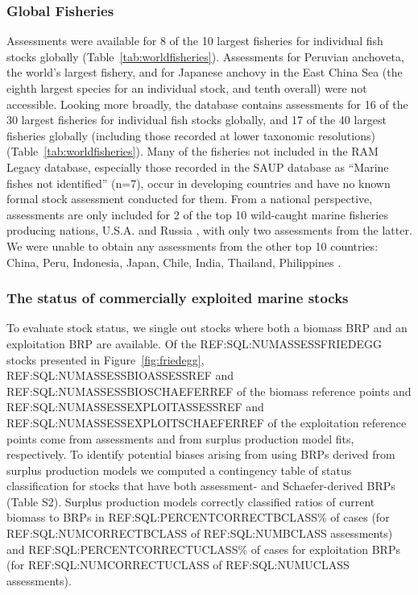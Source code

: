 \subsubsection*{Global Fisheries}
Assessments were available for 8 of the 10 largest fisheries for
individual fish stocks globally (Table~\ref{tab:worldfisheries}).
Assessments for Peruvian anchoveta, the world's largest fishery, and
for Japanese anchovy in the East China Sea (the eighth largest species
for an individual stock, and tenth overall) were not accessible.
Looking more broadly, the database contains assessments for 16 of the
30 largest fisheries for individual fish stocks globally, and 17 of
the 40 largest fisheries globally (including those recorded at lower
taxonomic resolutions) (Table~\ref{tab:worldfisheries}). Many of the
fisheries not included in the RAM Legacy database, especially those
recorded in the SAUP database as ``Marine fishes not identified''
(n=7), occur in developing countries and have no known formal stock
assessment conducted for them.  From a national perspective,
assessments are only included for 2 of the top 10 wild-caught marine
fisheries producing nations, U.S.A. and Russia \citep{FAO:sofia}, with
only two assessments from the latter. We were unable to obtain any
assessments from the other top 10 countries: China, Peru, Indonesia,
Japan, Chile, India, Thailand, Philippines \citep{FAO:sofia}.



\subsubsection*{The status of commercially exploited marine stocks }
To evaluate stock status, we single out stocks where both a biomass
BRP and an exploitation BRP are available. Of the
REF:SQL:NUMASSESSFRIEDEGG stocks presented in
Figure~\ref{fig:friedegg}, REF:SQL:NUMASSESSBIOASSESSREF and
REF:SQL:NUMASSESSBIOSCHAEFERREF of the biomass reference points and
REF:SQL:NUMASSESSEXPLOITASSESSREF and
REF:SQL:NUMASSESSEXPLOITSCHAEFERREF of the exploitation reference
points come from assessments and from surplus production model fits,
respectively.  To identify potential biases arising from using BRPs
derived from surplus production models we computed a contingency table
of status classification for stocks that have both assessment- and
Schaefer-derived BRPs (Table S2). Surplus production models correctly
classified ratios of current biomass to BRPs in
REF:SQL:PERCENTCORRECTBCLASS\% of cases (for REF:SQL:NUMCORRECTBCLASS
of REF:SQL:NUMBCLASS assessments) and REF:SQL:PERCENTCORRECTUCLASS\%
of cases for exploitation BRPs (for REF:SQL:NUMCORRECTUCLASS of
REF:SQL:NUMUCLASS assessments).

